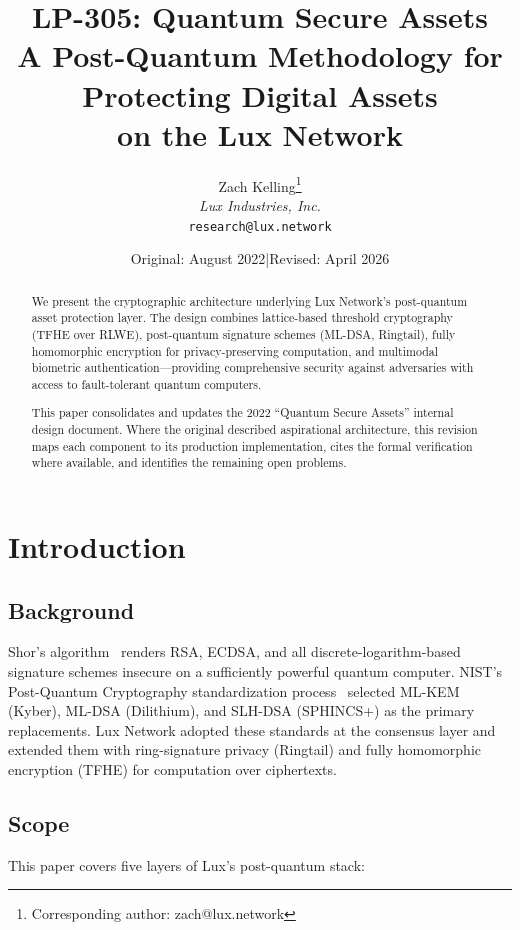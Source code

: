 \documentclass[11pt,a4paper]{article}
\title{LP-305: Quantum Secure Assets\\[4pt]
\large A Post-Quantum Methodology for Protecting Digital Assets\\
on the Lux Network}
\author{
Zach Kelling\thanks{Corresponding author: zach@lux.network}\\
\textit{Lux Industries, Inc.}\\
\texttt{research@lux.network}
}
\date{Original: August 2022\quad|\quad Revised: April 2026}
\begin{document}
\luxcoverpage

\begin{abstract}
We present the cryptographic architecture underlying Lux Network's
post-quantum asset protection layer. The design combines lattice-based
threshold cryptography (TFHE over RLWE), post-quantum signature schemes
(ML-DSA, Ringtail), fully homomorphic encryption for privacy-preserving
computation, and multimodal biometric authentication---providing
comprehensive security against adversaries with access to fault-tolerant
quantum computers.

This paper consolidates and updates the 2022 ``Quantum Secure Assets''
internal design document. Where the original described aspirational
architecture, this revision maps each component to its production
implementation, cites the formal verification where available, and
identifies the remaining open problems.
\end{abstract}

\tableofcontents
\newpage

\section{Introduction}

\subsection{Background}

Shor's algorithm~\cite{shor1999} renders RSA, ECDSA, and all
discrete-logarithm-based signature schemes insecure on a sufficiently
powerful quantum computer. NIST's Post-Quantum Cryptography
standardization process~\cite{nist-pqc} selected ML-KEM (Kyber),
ML-DSA (Dilithium), and SLH-DSA (SPHINCS+) as the primary
replacements. Lux Network adopted these standards at the consensus
layer and extended them with ring-signature privacy (Ringtail) and
fully homomorphic encryption (TFHE) for computation over ciphertexts.

\subsection{Scope}

This paper covers five layers of Lux's post-quantum stack:
\end{document}
